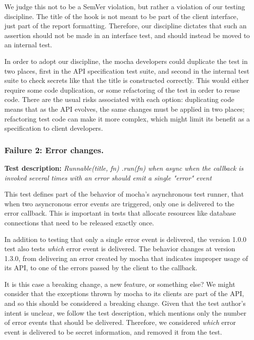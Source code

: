 We judge this not to be a SemVer violation, but rather a violation of
our testing discipline. The title of the hook is not meant to be part
of the client interface, just part of the report
formatting. Therefore, our discipline dictates that such an assertion
should not be made in an interface test, and should instead be moved
to an internal test.

In order to adopt our discipline, the mocha developers could duplicate
the test in two places, first in the API specification test suite, and
second in the internal test suite to check secrets like that the title
is constructed correctly. This would either require some code
duplication, or some refactoring of the test in order to reuse
code. There are the usual risks associated with each option:
duplicating code means that as the API evolves, the same changes must
be applied in two places; refactoring test code can make it more
complex, which might limit its benefit as a specification to client
developers.

\subsubsection{Failure 2: Error changes.}
{\bf Test description: }
%
{\em Runnable(title, fn) .run(fn) when async when the callback is
  invoked several times with an error should emit a single "error"
  event }

This test defines part of the behavior of mocha's asynchronous test
runner, that when two asyncronous error events are triggered, only one
is delivered to the error callback. This is important in tests that
allocate resources like database connections that need to be released
exactly once.

In addition to testing that only a single error event is delivered,
the version 1.0.0 test also tests {\em which} error event is
delivered. The behavior changes at version 1.3.0, from delivering an
error created by mocha that indicates improper usage of its API, to
one of the errors passed by the client to the callback.  

It is this case a breaking change, a new feature, or something else?
We might consider that the exceptions thrown by mocha to its clients
are part of the API, and so this should be considered a breaking
change.  Given that the test author's intent is unclear, we follow the
test description, which mentions only the number of error events that
should be delivered. Therefore, we considered {\em which} error event
is delivered to be secret information, and removed it from the test.

